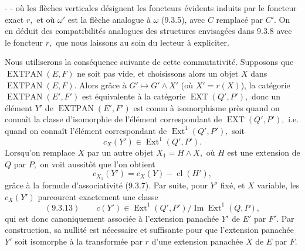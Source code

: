 -  -
où les flèches verticales désignent les foncteurs évidents induits par le foncteur exact \(r,\) et où \(\omega'\) est la flèche analogue à \(\omega\) (9.3.5), avec \(C\) remplacé par \(C'.\) On en déduit des compatibilités analogues des structures envisagées dans 9.3.8 avec le foncteur \(r,\) que nous laissons au soin du lecteur à expliciter.

Nous utiliserons la conséquence suivante de cette commutativité. Supposons que \(\operatorname{EXTPAN}(E,F)\) ne soit pas vide, et choisissons alors un objet \(X\) dans \(\operatorname{EXTPAN}(E,F).\) Alors grâce à \(G'\longmapsto G'\wedge X'\) (où \(X'=r(X)\)), la catégorie \(\operatorname{EXTPAN}(E',F')\) est équivalente à la catégorie \(\operatorname{EXT}(Q',P'),\) donc un élément \(Y'\) de \(\operatorname{EXTPAN}(E',F')\) est connu à isomorphisme près quand on connaît la classe d'isomorphie de l'élément correspondant de \(\operatorname{EXT}(Q',P'),\) i.e. quand on connaît l'élément correspondant de \(\operatorname{Ext}^1(Q',P'),\) soit
\[
c_X(Y')\in\operatorname{Ext}^1(Q',P').
\]
Lorsqu'on remplace \(X\) par un autre objet \(X_1=H\wedge X,\) où \(H\) est une extension de \(Q\) par \(P,\) on voit aussitôt que l'on obtient
\[
c_{X_1}(Y')=c_X(Y)-\operatorname{cl}(H'),
\]
grâce à la formule d'associativité (9.3.7). Par suite, pour \(Y'\) fixé, et \(X\) variable, les \(c_X(Y')\) parcourent exactement une classe
\[
(9.3.13)\qquad c(Y')\in\operatorname{Ext}^1(Q',P')/\operatorname{Im}\operatorname{Ext}^1(Q,P),
\]
qui est donc canoniquement associée à l'extension panachée \(Y'\) de \(E'\) par \(F'.\) Par construction, sa nullité est nécessaire et suffisante pour que l'extension panachée \(Y'\) soit isomorphe à la transformée par \(r\) d'une extension panachée \(X\) de \(E\) par \(F.\)
